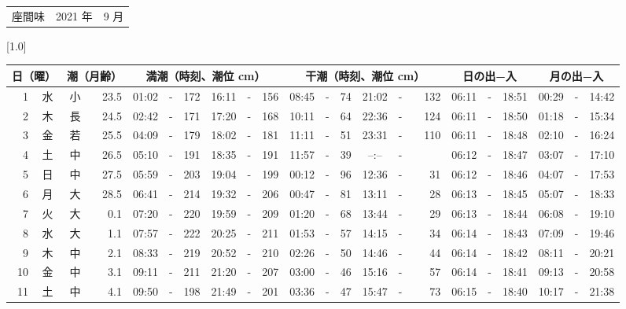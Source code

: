 \documentclass[12pt,a4j]{jsarticle}
\begin{document}
 \begin{table}[htbp]
 \begin{center}
 \begin{tabular}{lcc}
 \LARGE{座間味}  & \large{2021 年} & \large{ 9 月} \\
 \end{tabular}
 \end{center}
 \begin{center}
    \scalebox{0.7}[1.0]{
    \begin{tabular}{|rc|cr|ccrccr|ccrccr|ccc|ccc|}
    \hline
    \multicolumn{2}{|c|}{日（曜）} & \multicolumn{2}{c|}{潮（月齢）} & \multicolumn{6}{c|}{満潮（時刻、潮位 cm）} & \multicolumn{6}{c|}{干潮（時刻、潮位 cm）} & \multicolumn{3}{c|}{日の出−入} &  \multicolumn{3}{c|}{月の出−入}\\
 \hline
 1 & 水 & 小 & 23.5 &  01:02 &-& 172 &  16:11 &-& 156 &  08:45 &-&  74 &  21:02 &-& 132 & 06:11 & -& 18:51 & 00:29 & -& 14:42 \\
 2 & 木 & 長 & 24.5 &  02:42 &-& 171 &  17:20 &-& 168 &  10:11 &-&  64 &  22:36 &-& 124 & 06:11 & -& 18:50 & 01:18 & -& 15:34 \\
 3 & 金 & 若 & 25.5 &  04:09 &-& 179 &  18:02 &-& 181 &  11:11 &-&  51 &  23:31 &-& 110 & 06:11 & -& 18:48 & 02:10 & -& 16:24 \\
 4 & 土 & 中 & 26.5 &  05:10 &-& 191 &  18:35 &-& 191 &  11:57 &-&  39 &  --:-- &-&~~~~~ & 06:12 & -& 18:47 & 03:07 & -& 17:10 \\
 5 & 日 & 中 & 27.5 &  05:59 &-& 203 &  19:04 &-& 199 &  00:12 &-&  96 &  12:36 &-&  31 & 06:12 & -& 18:46 & 04:07 & -& 17:53 \\
 6 & 月 & 大 & 28.5 &  06:41 &-& 214 &  19:32 &-& 206 &  00:47 &-&  81 &  13:11 &-&  28 & 06:13 & -& 18:45 & 05:07 & -& 18:33 \\
 7 & 火 & 大 &  0.1 &  07:20 &-& 220 &  19:59 &-& 209 &  01:20 &-&  68 &  13:44 &-&  29 & 06:13 & -& 18:44 & 06:08 & -& 19:10 \\
 8 & 水 & 大 &  1.1 &  07:57 &-& 222 &  20:25 &-& 211 &  01:53 &-&  57 &  14:15 &-&  34 & 06:14 & -& 18:43 & 07:09 & -& 19:46 \\
 9 & 木 & 中 &  2.1 &  08:33 &-& 219 &  20:52 &-& 210 &  02:26 &-&  50 &  14:46 &-&  44 & 06:14 & -& 18:42 & 08:11 & -& 20:21 \\
10 & 金 & 中 &  3.1 &  09:11 &-& 211 &  21:20 &-& 207 &  03:00 &-&  46 &  15:16 &-&  57 & 06:14 & -& 18:41 & 09:13 & -& 20:58 \\
11 & 土 & 中 &  4.1 &  09:50 &-& 198 &  21:49 &-& 201 &  03:36 &-&  47 &  15:47 &-&  73 & 06:15 & -& 18:40 & 10:17 & -& 21:38 \\

\end{tabular}}
\end{center}
\end{table}
\end{document}
